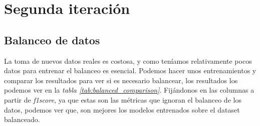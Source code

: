 \section{Segunda iteración}

\subsection{Balanceo de datos}
\label{sec:i2-balance}

La toma de nuevos datos reales es costosa, y como teníamos relativamente pocos datos para entrenar el balanceo es esencial. Podemos hacer unos entrenamientos y comparar los resultados para ver si es necesario balancear, los resultados los podemos ver en la \textit{tabla \ref{tab:balanced_comparison}}. Fijándonos en las columnas a partir de \textit{f1score}, ya que estas son las métricas que ignoran el balanceo de los datos, podemos ver que, son mejores los modelos entrenados sobre el \gls{dataset} balanceado.

